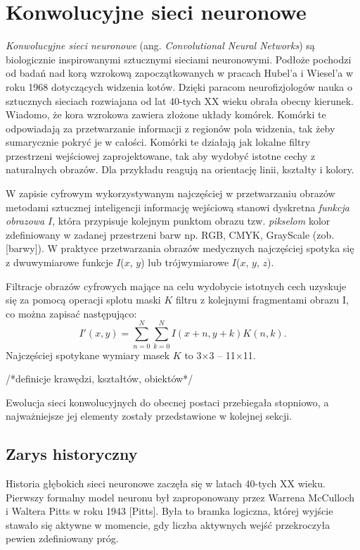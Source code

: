 \chapter{Konwolucyjne sieci neuronowe}
\textit{Konwolucyjne sieci neuronowe} (ang. \textit{Convolutional Neural Networks}) są biologicznie inspirowanymi sztucznymi sieciami neuronowymi. Podłoże pochodzi od badań nad korą wzrokową zapoczątkowanych w pracach Hubel'a i Wiesel’a w roku 1968 dotyczących widzenia kotów. Dzięki paracom neurofizjologów nauka o sztucznych sieciach rozwiajana od lat 40-tych XX wieku obrała obecny kierunek. Wiadomo, że kora wzrokowa zawiera złożone układy komórek. Komórki te odpowiadają za przetwarzanie informacji z regionów pola widzenia, tak żeby sumarycznie pokryć je w całości. Komórki te działają jak lokalne filtry przestrzeni wejściowej zaprojektowane, tak aby wydobyć istotne cechy z naturalnych obrazów. Dla przykładu reagują na orientację linii, kształty i kolory.

W zapisie cyfrowym wykorzystywanym najczęściej w przetwarzaniu obrazów metodami sztucznej inteligencji informację wejściową stanowi dyskretna \textit{funkcja obrazowa} $I$, która przypisuje kolejnym punktom obrazu tzw. \textit{pikselom} kolor zdefiniowany w zadanej przestrzeni barw np. RGB, CMYK, GrayScale (zob. [barwy]). W praktyce przetwarzania obrazów medycznych najczęściej spotyka się z dwuwymiarowe funkcje $I$($x$, $y$) lub trójwymiarowe $I$($x$, $y$, $z$).

Filtracje obrazów cyfrowych mające na celu wydobycie istotnych cech uzyskuje się za pomocą operacji splotu maski $K$ filtru z kolejnymi fragmentami obrazu I, co można zapisać następująco:
\begin{equation}
	I'\left(x, y\right) = \sum_{n=0}^{N} \sum_{k=0}^{N} I\left(x + n, y + k \right)K\left(n, k\right).
\end{equation}
Najczęściej spotykane wymiary masek $K$ to 3$\times$3 -- 11$\times$11. 

/*definicje krawędzi, kształtów, obiektów*/

Ewolucja sieci konwolucyjnych do obecnej postaci przebiegała stopniowo, a najważniejsze jej elementy zostały przedstawione w kolejnej sekcji. 

\section{Zarys historyczny}

Historia głębokich sieci neuronowe zaczęła się w latach 40-tych XX wieku. Pierwszy formalny model neuronu był zaproponowany przez Warrena McCulloch i Waltera Pitts w roku 1943 [Pitts]. Była to bramka logiczna, której wyjście stawało się aktywne w momencie, gdy liczba aktywnych wejść przekroczyła pewien zdefiniowany próg. 

